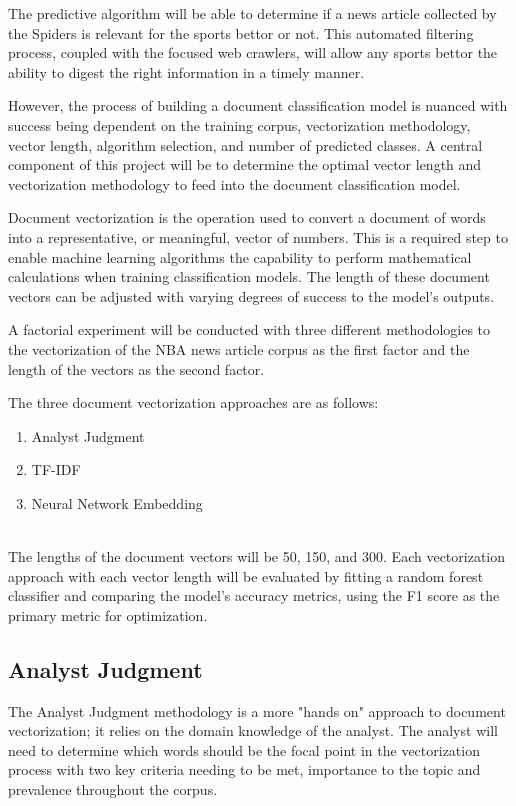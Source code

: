 \documentclass[5p,authoryear]{elsarticle}
\begin{document}
The predictive algorithm will be able to determine if a news article collected by the Spiders is relevant for the sports bettor or not. 
This automated filtering process, coupled with the focused web crawlers, will allow any sports bettor the ability to digest the right information in a timely manner. 

However, the process of building a document classification model is nuanced with success being dependent on the training corpus, vectorization methodology, vector length, algorithm selection, and number of predicted classes. 
A central component of this project will be to determine the optimal vector length and vectorization methodology to feed into the document classification model. 

Document vectorization is the operation used to convert a document of words into a representative, or meaningful, vector of numbers.
This is a required step to enable machine learning algorithms the capability to perform mathematical calculations when training classification models. 
The length of these document vectors can be adjusted with varying degrees of success to the model's outputs.

A factorial experiment will be conducted with three different methodologies to the vectorization of the NBA news article corpus as the first factor and the length of the vectors as the second factor. 

The three document vectorization approaches are as follows: 

\begin{enumerate}
 \item Analyst Judgment
 \item TF-IDF
 \item Neural Network Embedding
\end{enumerate} \\
 
The lengths of the document vectors will be 50, 150, and 300. 
Each vectorization approach with each vector length will be evaluated by fitting a random forest classifier and comparing the model's accuracy metrics, using the F1 score as the primary metric for optimization.  

\subsection{Analyst Judgment}

The Analyst Judgment methodology is a more "hands on" approach to document vectorization; it relies on the domain knowledge of the analyst. 
The analyst will need to determine which words should be the focal point in the vectorization process with two key criteria needing to be met, importance to the topic and prevalence throughout the corpus. 
\end{document}
